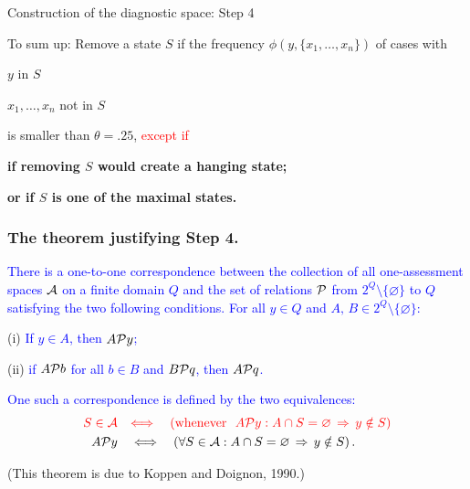 \documentclass{beamer}
\def\tl{\vskip 2mm}
\def\es{\varnothing}
\def\itbul{\item[$\bullet$]}
\def\hh{\theta}
\def\EQ{\Longleftrightarrow}
\def\AAA{{\cal A}}
\def\PPP{{\cal P}}
\def\rtxt#1{\textcolor{red}{#1}}
\def\btxt#1{\textcolor{blue}{#1}}
\begin{document}
\begin{frame}{Construction of the diagnostic space: Step 4}
\center
\begin{minipage}{11cm} 
To sum up:
\tl
Remove a state $S$ if the frequency $\phi(y,\{x_1,\ldots,x_n\})$ of cases with
\begin{roster}
\itbul  $y$ in $S$
\itbul $x_1,\ldots,x_n$ not in $S$
\end{roster}
is smaller than $\hh = .25$, \rtxt{except if}
\begin{roster}
\item {\bf if removing $S$ would create a hanging state;}\\  
\item{\bf or if $S$ is one of  the maximal states.}
\end{roster}
\end{minipage}
 \vspace{.2cm}

\end{frame}
  
\begin{frame}
\frametitle{The theorem justifying Step 4.}
\vspace{-.2cm}

 \begin{theorem} \btxt{There is a one-to-one correspondence between the collection of all one-assessment spaces $\AAA$ on a finite domain $Q$  and the set of relations $\PPP$  from $2^Q\setminus\{\es\}$ to $Q$ satisfying the two following conditions.
 For all $y\in Q$ and $A,\,B\in 2^Q\setminus\{\es\}$:}
 \begin{roster}
 \item[{\rm (i)}]\btxt{ If $y\in A$, then $A\PPP y$;} 
 \item[{\rm (ii)}]\btxt{ if $A\PPP b$ for all $b\in B$ and $B\PPP q$, then $A\PPP q$.}
 \end{roster} 
\btxt{ One such a correspondence is defined by the two equivalences: 
 \begin{align*}
\rtxt{S\in \AAA}\quad &\rtxt{\EQ\quad(\text{whenever }\,\,A\PPP y: A\cap S=\es\, \Rightarrow\, y\notin S)} \\
 A\PPP y\quad &\EQ\quad(\forall S\in \AAA: A\cap S = \es\,\Rightarrow\,y\notin S)\,.
 \end{align*} 
 \tl
 }
 \end{theorem} 
 (This theorem is due to Koppen and Doignon, 1990.)
  \vspace{.2cm}

\end{frame}
\end{document}
